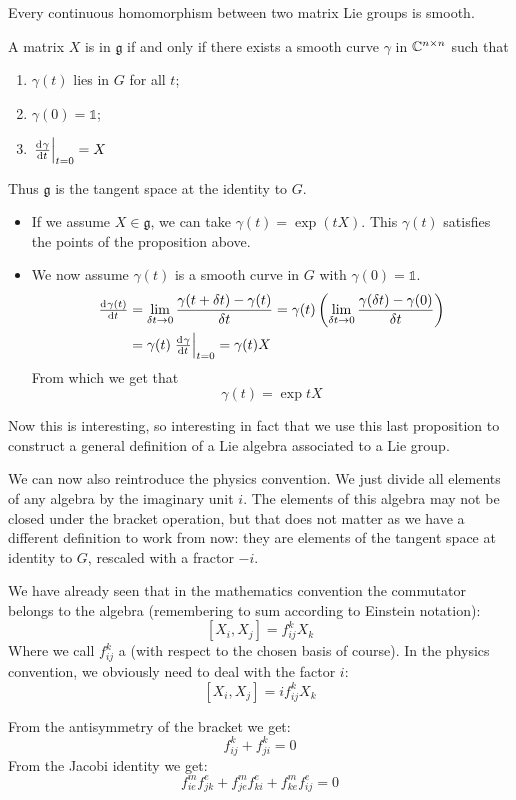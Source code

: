 \begin{eigenschap}
Every continuous homomorphism between two matrix Lie groups is smooth.
\end{eigenschap}

\begin{eigenschap}
A matrix $X$ is in $\mathfrak{g}$ if and only if there exists a smooth curve $\gamma$ in $\mathbb{C}^{n\times n}$ such that
\begin{enumerate}
\item $\gamma(t)$ lies in $G$ for all $t$;
\item $\gamma(0) = \mathbb{1}$;
\item $\left.\od{\gamma}{t}\right|_{t=0} = X$
\end{enumerate}
Thus $\mathfrak{g}$ is the tangent space at the identity to $G$.
\end{eigenschap}


\begin{itemize}
\item If we assume $X \in \mathfrak{g}$, we can take $\gamma(t) = \exp(tX)$. This $\gamma(t)$ satisfies the points of the proposition above.
\item We now assume $\gamma(t)$ is a smooth curve in $G$ with $\gamma(0) = \mathbb{1}$.
\begin{align}\od{\gamma(t)}{t} &= \lim_{\delta t \to 0} \frac{\gamma(t+\delta t)-\gamma(t)}{\delta t} = \gamma(t)\left(\lim_{\delta t \to 0}\frac{\gamma(\delta t)-\gamma(0)}{\delta t}\right) \\ &= \gamma(t)\left.\od{\gamma}{t}\right|_{t=0} = \gamma(t)X \end{align}
From which we get that
\[ \gamma(t) = \exp{tX} \]
\end{itemize}

Now this is interesting, so interesting in fact that we use this last proposition to construct a general definition of a Lie algebra associated to a Lie group.

We can now also reintroduce the physics convention. We just divide all elements of any algebra by the imaginary unit $i$. The elements of this algebra may not be closed under the bracket operation, but that does not matter as we have a different definition to work from now: they are elements of the tangent space at identity to $G$, rescaled with a fractor $-i$.

We have already seen that in the mathematics convention the commutator belongs to the algebra (remembering to sum according to Einstein notation):
\[ [X_i, X_j] = f_{ij}^k X_k \]
Where we call $f_{ij}^k$ a  (with respect to the chosen basis of course). In the physics convention, we obviously need to deal with the factor $i$:
\[ [X_i, X_j] = if_{ij}^k X_k \]
\begin{eigenschap}
From the antisymmetry of the bracket we get:
\[ f^k_{ij} + f^k_{ji} = 0 \]
From the Jacobi identity we get:
\[ f^m_{ie}f^e_{jk} + f^m_{je}f^e_{ki} + f^m_{ke}f^e_{ij} = 0 \]
\end{eigenschap}

